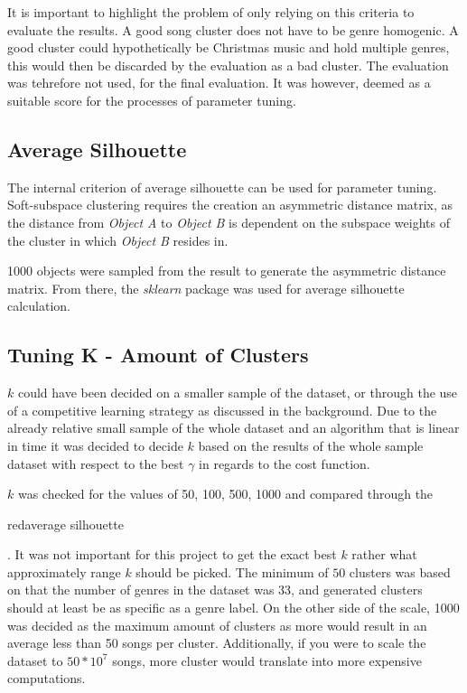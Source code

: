\documentclass[../report.tex]{subfiles}
\begin{document}
It is important to highlight the problem of only relying on this criteria to evaluate the results. A good song cluster does not have to be genre homogenic. A good cluster could hypothetically be Christmas music and hold multiple genres, this would then be discarded by the evaluation as a bad cluster. The evaluation was tehrefore not used, for the final evaluation. It was however, deemed as a suitable score for the processes of parameter tuning.

\subsection{Average Silhouette}

The internal criterion of average silhouette can be used for parameter tuning. Soft-subspace clustering requires the creation an asymmetric distance matrix, as the distance from \textit{Object A} to \textit{Object B} is dependent on the subspace weights of the cluster in which \textit{Object B} resides in.

1000 objects were sampled from the result to generate the asymmetric distance matrix. From there, the \textit{sklearn} package was used for average silhouette calculation.

\subsection{Tuning K - Amount of Clusters}

$k$ could have been decided on a smaller sample of the dataset, or through the use of a competitive learning strategy as discussed in the background. Due to the already relative small sample of the whole dataset and an algorithm that is linear in time it was decided to decide $k$ based on the results of the whole sample dataset with respect to the best $\gamma$ in regards to the cost function.

$k$ was checked for the values of 50, 100, 500, 1000 and compared through the \begin{color}{red}{average silhouette} \end{color}. It was not important for this project to get the exact best $k$ rather what approximately range $k$ should be picked. The minimum of $50$ clusters was based on that the number of genres in the dataset was 33, and generated clusters should at least be as specific as a genre label. On the other side of the scale, 1000 was decided as the maximum amount of clusters as more would result in an average less than 50 songs per cluster. Additionally, if you were to scale the dataset to $50*10^7$ songs, more cluster would translate into more expensive computations.
\end{document}
